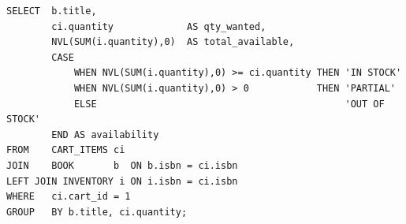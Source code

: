 \begin{lstlisting}[caption={Q9: Stock availability check for cart items}]
SELECT  b.title,
        ci.quantity             AS qty_wanted,
        NVL(SUM(i.quantity),0)  AS total_available,
        CASE
            WHEN NVL(SUM(i.quantity),0) >= ci.quantity THEN 'IN STOCK'
            WHEN NVL(SUM(i.quantity),0) > 0            THEN 'PARTIAL'
            ELSE                                            'OUT OF STOCK'
        END AS availability
FROM    CART_ITEMS ci
JOIN    BOOK       b  ON b.isbn = ci.isbn
LEFT JOIN INVENTORY i ON i.isbn = ci.isbn
WHERE   ci.cart_id = 1
GROUP   BY b.title, ci.quantity;
\end{lstlisting}